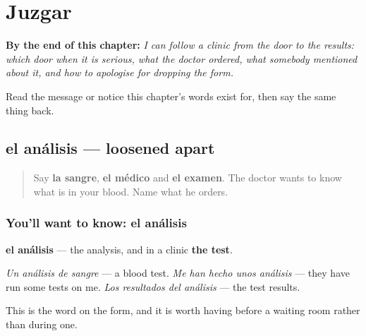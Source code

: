 
\chapter{Juzgar}
\label{ch:es-juicio}

\begin{chapteropening}
\textbf{By the end of this chapter:} \emph{I can follow a clinic from the door to the results: which door when it is serious, what the doctor ordered, what somebody mentioned about it, and how to apologise for dropping the form.}

Read the message or notice this chapter's words exist for, then say the same thing back.
\end{chapteropening}

\section[el análisis]{el análisis — loosened apart}

\label{lesson:ES-C447-analisis}



\begin{quote}
Say \textbf{la sangre}, \textbf{el médico} and \textbf{el examen}. The doctor wants to know what is in your blood. Name what he orders.
\end{quote}

\subsection*{You'll want to know: el análisis}
\textbf{el análisis} — the analysis, and in a clinic \textbf{the test}.

\emph{Un análisis de sangre} — a blood test. \emph{Me han hecho unos análisis} — they have run some tests on me. \emph{Los resultados del análisis} — the test results.

This is the word on the form, and it is worth having before a waiting room rather than during one.

